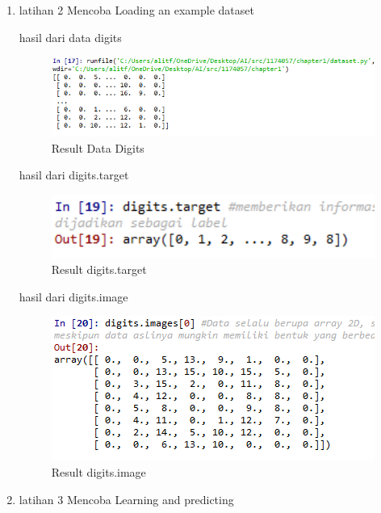\begin{enumerate}
		\item latihan 2 Mencoba Loading an example dataset
		
		\subitem hasil dari data digits
		\begin{figure}[H]
		\centering
		\includegraphics[width=1.5\textwidth]{figures/1174057/chapter1/4.png}
		\caption{Result Data Digits}
		\label{print}
		\end{figure}

		\subitem hasil dari digits.target
		\begin{figure}[H]
		\centering
		\includegraphics[width=1\textwidth]{figures/1174057/chapter1/5.png}
		\caption{Result digits.target}
		\label{print}
		\end{figure}

		\subitem hasil dari digits.image
		\begin{figure}[H]
		\centering
		\includegraphics[width=1\textwidth]{figures/1174057/chapter1/6.png}
		\caption{Result digits.image}
		\label{print}
		\end{figure}


		\item latihan 3 Mencoba Learning and predicting
		
	\end{enumerate}


